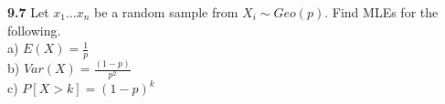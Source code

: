 

{\bf 9.7} Let $x_{1}...x_{n}$ be a random sample from ${ X }_{ i }\sim Geo(p)$. Find MLEs for the following. \\


\noindent a) $E(X)= \frac{1}{p}$\\

\noindent b) $Var(X)=\frac{(1-p)}{p^{2}}$\\

\noindent c) $P[X>k]= (1-p)^{k}$\\
